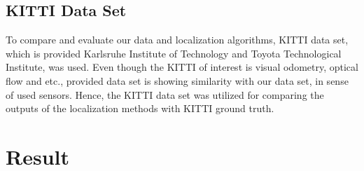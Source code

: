 \subsection{KITTI Data Set}\label{KITTI-set}
To compare and evaluate our data and localization algorithms, KITTI data set, which is provided  Karlsruhe Institute of Technology
and Toyota Technological Institute, was used. Even though the KITTI of interest is visual odometry, optical flow and etc., provided data set is showing similarity with our data set, in sense of used sensors. Hence, the KITTI data set was utilized for comparing the outputs of the localization methods with KITTI ground truth.
\newpage
\section{Result}\label{sec:result}